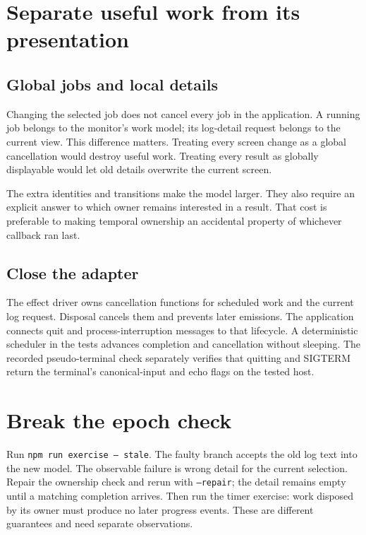\section{Separate useful work from its presentation}

\subsection{Global jobs and local details}

Changing the selected job does not cancel every job in the application. A running job belongs to the monitor's work model; its log-detail request belongs to the current view. This difference matters. Treating every screen change as a global cancellation would destroy useful work. Treating every result as globally displayable would let old details overwrite the current screen.

The extra identities and transitions make the model larger. They also require an explicit answer to which owner remains interested in a result. That cost is preferable to making temporal ownership an accidental property of whichever callback ran last.

\subsection{Close the adapter}

The effect driver owns cancellation functions for scheduled work and the current log request. Disposal cancels them and prevents later emissions. The application connects quit and process-interruption messages to that lifecycle. A deterministic scheduler in the tests advances completion and cancellation without sleeping. The recorded pseudo-terminal check separately verifies that quitting and SIGTERM return the terminal's canonical-input and echo flags on the tested host.

\section{Break the epoch check}

Run \texttt{npm run exercise -- stale}. The faulty branch accepts the old log text into the new model. The observable failure is wrong detail for the current selection. Repair the ownership check and rerun with \texttt{--repair}; the detail remains empty until a matching completion arrives. Then run the timer exercise: work disposed by its owner must produce no later progress events. These are different guarantees and need separate observations.
